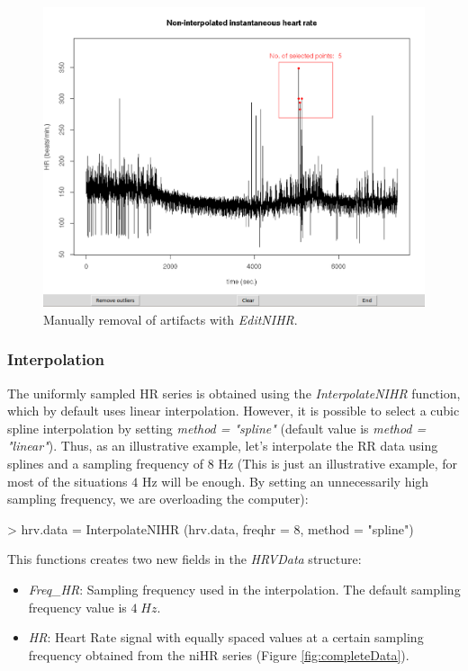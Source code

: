 \documentclass[12pt,lot, lof]{puthesis}
\begin{document}
\begin{figure}[h]
\centering
\includegraphics{figures/removing}
\caption{Manually removal of artifacts with 
\textit{EditNIHR}.\label{fig:plottingNIHR}}
\end{figure}

\subsubsection{Interpolation} The uniformly sampled \gls{HR} series is obtained 
using the \textit{InterpolateNIHR} function, which by default uses linear 
interpolation. However, it is possible to select a cubic spline interpolation 
by setting 
\textit{method = "spline"} (default value is \textit{method = "linear"}). Thus, 
as an illustrative example, let's interpolate the RR data using splines and a 
sampling frequency of $8$ Hz (This is just an illustrative example, for most of 
the situations $4$ Hz will be enough. By setting an unnecessarily high sampling 
frequency, we are overloading the computer):
\begin{Schunk}
\begin{Sinput}
> hrv.data = InterpolateNIHR (hrv.data, freqhr = 8, method = "spline")
\end{Sinput}
\end{Schunk}

This functions creates two new fields in the \textit{HRVData} structure:
\begin{itemize}
\item \textit{Freq\_HR}: Sampling frequency used in the interpolation. The 
default sampling frequency value is $4\;Hz$.
\item \textit{HR}: 	Heart Rate signal with equally spaced values at a 
certain sampling frequency obtained from the \gls{niHR} series (Figure 
\ref{fig:completeData}). 
\end{itemize}
\end{document}
